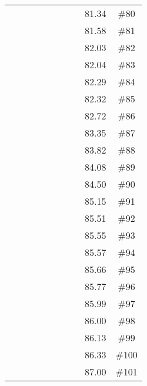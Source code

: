 \begin{longtable}{|c|c|c|c|c|c|c|c|c|c|}
 \x    & \x    & \x    & \x    &       & \x    &       & \x    & 81.34 & \#80 \\
 \x    & \x    &       &       & \x\m  & \x\m  &       & \x\m  & 81.58 & \#81 \\
 \x    & \x    & \x    & \x    &       &       &       & \x\m  & 82.03 & \#82 \\
 \x    & \x    & \x    &       & \x    & \x\m  & \x    &       & 82.04 & \#83 \\
 \x    & \x    &       & \x    & \x    &       &       &       & 82.29 & \#84 \\
 \x    & \x    & \x    &       &       & \x\m  &       &       & 82.32 & \#85 \\
 \x    & \x    &       & \x    &       &       &       &       & 82.72 & \#86 \\
 \x    & \x    &       &       & \x    &       &       &       & 83.35 & \#87 \\
 \x    & \x    & \x    &       & \x\m  &       & \x    &       & 83.82 & \#88 \\
 \x    & \x    & \x    &       & \x    & \x\m  &       & \x    & 84.08 & \#89 \\
 \x    & \x    &       & \x    & \x\m  & \x\m  & \x\m  &       & 84.50 & \#90 \\
 \x    & \x    &       &       & \x\m  & \x\m  &       &       & 85.15 & \#91 \\
 \x    & \x    &       & \x    & \x\m  &       &       & \x\m  & 85.51 & \#92 \\
 \x    & \x    & \x    &       &       &       & \x    &       & 85.55 & \#93 \\
 \x    & \x    & \x    &       &       & \x    &       & \x    & 85.57 & \#94 \\
 \x    & \x    & \x    &       &       &       &       & \x    & 85.66 & \#95 \\
 \x    & \x    & \x    &       & \x\m  &       & \x\m  &       & 85.77 & \#96 \\
 \x    & \x    & \x    &       &       & \x    & \x    &       & 85.99 & \#97 \\
 \x    & \x    &       &       & \x    & \x    &       &       & 86.00 & \#98 \\
 \x    & \x    & \x    &       & \x\m  &       &       & \x    & 86.13 & \#99 \\
 \x    & \x    &       & \x    &       & \x    &       &       & 86.33 & \#100 \\
 \x    & \x    &       &       & \x\m  &       &       & \x\m  & 87.00 & \#101 \\

\end{longtable}
